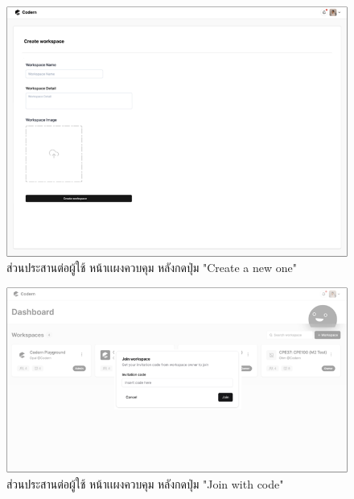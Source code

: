 \documentclass[12pt,one side,openright,a4paper]{cpe-thesis-th}
\begin{document}
\hypertarget{ui-dashboard3}{
  \begin{figure}[H]
    \centering
    \includegraphics[width=15cm]{figure/ui/ui-dashboard3.png}
    \caption[ส่วนประสานต่อผู้ใช้ หน้าเเผงควบคุม (กดปุ่ม "Create a new one")]{ ส่วนประสานต่อผู้ใช้ หน้าเเผงควบคุม หลังกดปุ่ม "Create a new one"}
    \label{fig:ui-dashboard3}
  \end{figure}
}

\hypertarget{ui-dashboard4}{
  \begin{figure}[H]
    \centering
    \includegraphics[width=15cm]{figure/ui/ui-dashboard4.png}
    \caption[ส่วนประสานต่อผู้ใช้ หน้าเเผงควบคุม (กดปุ่ม "Join with code")]{ส่วนประสานต่อผู้ใช้ หน้าเเผงควบคุม หลังกดปุ่ม "Join with code" }
    \label{fig:ui-dashboard4}
  \end{figure}
}
\end{document}
